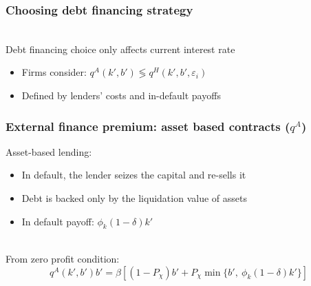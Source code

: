 \documentclass[notes]{beamer}
\begin{document}
\begin{frame}[label=slide2] \frametitle{Choosing debt financing strategy}
\begin{table}[h!]
\centering
\resizebox{1\textwidth}{!}{%
\begin{tabular}{l|cc}
\textbf{Firms choose:}  & Asset based contract & Hybrid contract  \\  
  \midrule
Implied interest rate & $q^A(k',b')$ &  $q^H(k',b',\varepsilon_i)$ \\
CFL reliance & $0$ & $(0,1]$ \\ 
Default resolution & Liquidation & Liquidation \textbf{or} Reorganization \\ 
In-default payment & Value of assets & Value of assets \textbf{or} Cont. value\\ 
Fixed costs & Zero & Significant ($\zeta_1$, $\zeta_2$) \\
\bottomrule
\end{tabular}
}
\label{tab:shares}
\end{table}  \vspace{3mm} \\

Debt financing choice only affects current interest rate
\begin{itemize} \setlength\itemsep{0em}
    \item Firms consider: $q^A(k',b') \lessgtr q^H(k',b',\varepsilon_i)$ 
    \item Defined by lenders' costs and in-default payoffs
\end{itemize}

\end{frame}



\begin{frame}[label=exprem] \frametitle{External finance premium: asset based contracts ($q^{A}$)}
Asset-based lending: 
\begin{itemize} \setlength\itemsep{0em}
\item In default, the lender seizes the capital and re-sells it
\item Debt is backed only by the liquidation value of assets
\item In default payoff:  $ \phi_k (1-\delta) k'$
\end{itemize}  \vspace{5mm} \\
From zero profit condition: 
$$ q^A(k',b')b' = \beta \left[ (1-P_\chi) b' + P_\chi \min\{b', \ \phi_k (1-\delta) k' \} \right]    $$  

\end{frame}
\end{document}
